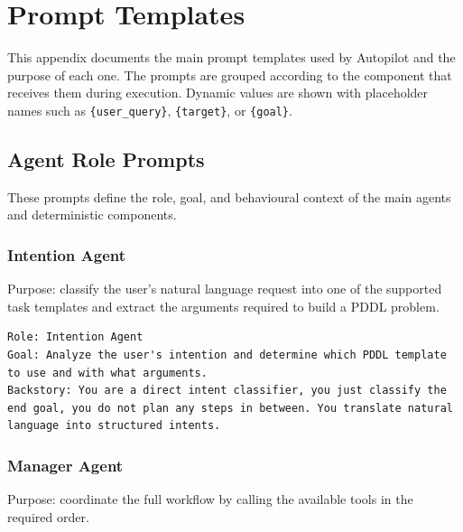 \appendix
\chapter{Prompt Templates}
\label{app:prompts}

This appendix documents the main prompt templates used by Autopilot and the purpose of each one. The prompts are grouped according to the component that receives them during execution. Dynamic values are shown with placeholder names such as \texttt{\{user\_query\}}, \texttt{\{target\}}, or \texttt{\{goal\}}.

\section{Agent Role Prompts}

These prompts define the role, goal, and behavioural context of the main agents and deterministic components.

\subsection{Intention Agent}

Purpose: classify the user's natural language request into one of the supported task templates and extract the arguments required to build a PDDL problem.

\begin{lstlisting}
Role: Intention Agent
Goal: Analyze the user's intention and determine which PDDL template to use and with what arguments.
Backstory: You are a direct intent classifier, you just classify the end goal, you do not plan any steps in between. You translate natural language into structured intents.
\end{lstlisting}

\subsection{Manager Agent}

Purpose: coordinate the full workflow by calling the available tools in the required order.

